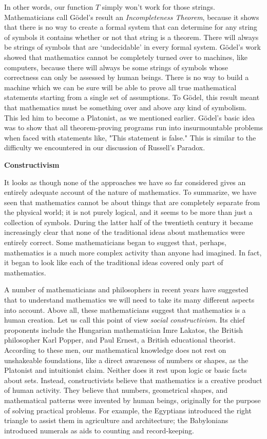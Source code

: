 In other words, our function $T$ simply won't work for those strings.  Mathematicians call G\"{o}del's result an \emph{Incompleteness Theorem}, because it shows that there is no way to create a formal system that can determine for any string of symbols it contains whether or not that string is a theorem.  There will always be strings of symbols that are `undecidable' in every formal system.  
G\"{o}del's work showed that mathematics cannot be completely turned over to machines, like computers, because there will always be some strings of symbols whose correctness can only be assessed by human beings.  There is no way to build a machine which we can be sure will be able to prove all true mathematical statements starting from a single set of assumptions.  To G\"{o}del, this result meant that mathematics must be something over and above any kind of symbolism.  This led him to become a Platonist, as we mentioned earlier.  G\"{o}del's basic idea was to show that all theorem-proving programs run into insurmountable problems when faced with statements like, "This statement is false."  This is similar to the difficulty we encountered in our discussion of Russell's Paradox.

\noindent
\textbf{Constructivism}

It looks as though none of the approaches we have so far considered gives an entirely adequate account of the nature of mathematics.  To summarize, we have seen that mathematics cannot be about things that are completely separate from the physical world; it is not purely logical, and it seems to be more than just a collection of symbols.  During the latter half of the twentieth century it became increasingly clear that none of the traditional ideas about mathematics were entirely correct.  Some mathematicians began to suggest that, perhaps, mathematics is a much more complex activity than anyone had imagined.  In fact, it began to look like each of the traditional ideas covered only part of mathematics. 
 
     A number of mathematicians and philosophers in recent years have suggested that to understand mathematics we will need to take its many different aspects into account.  Above all, these mathematicians suggest that mathematics is a human creation. Let us call this point of view \emph{social constructivism}.  Its chief proponents include the Hungarian mathematician Imre Lakatos, the British philosopher Karl Popper, and Paul Ernest, a British educational theorist.  According to these men, our mathematical knowledge does not rest on unshakeable foundations, like a direct awareness of numbers or shapes, as the Platonist and intuitionist  claim.  Neither does it rest upon logic or basic facts about sets.  Instead, constructivists believe that mathematics is a creative product of human activity.  They believe that numbers, geometrical shapes, and mathematical patterns were invented by human beings, originally for the purpose of solving practical problems.  For example, the Egyptians introduced the right triangle to assist them in agriculture and architecture; the Babylonians introduced numerals as aids to counting and record-keeping. 
      
